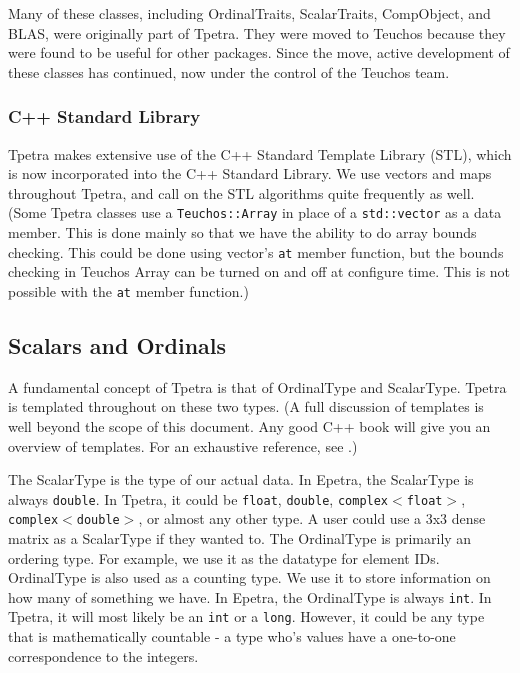 \documentclass[10pt,relax]{TpetraDesign}
\begin{document}
Many of these classes, including OrdinalTraits, ScalarTraits, CompObject, and BLAS, were originally part of Tpetra. They were moved to Teuchos because they were found to be useful for other packages. Since the move, active development of these classes has continued, now under the control of the Teuchos team.

\subsubsection*{C++ Standard Library}
Tpetra makes extensive use of the C++ Standard Template Library (STL), which is now incorporated into the C++ Standard Library. We use vectors and maps throughout Tpetra, and call on the STL algorithms quite frequently as well. (Some Tpetra classes use a \texttt{Teuchos::Array} in place of a \texttt{std::vector} as a data member. This is done mainly so that we have the ability to do array bounds checking. This could be done using vector's \texttt{at} member function, but the bounds checking in Teuchos Array can be turned on and off at configure time. This is not possible with the \texttt{at} member function.)

%
\subsection{Scalars and Ordinals}
A fundamental concept of Tpetra is that of OrdinalType and ScalarType. Tpetra is templated throughout on these two types. (A full discussion of templates is well beyond the scope of this document. Any good C++ book will give you an overview of templates. For an exhaustive reference, see \cite{Templates-Complete-Guide}.)

The ScalarType is the type of our actual data. In Epetra, the ScalarType is always \texttt{double}. In Tpetra, it could be \texttt{float}, \texttt{double}, \texttt{complex$<$float$>$}, \texttt{complex$<$double$>$}, or almost any other type. A user could use a 3x3 dense matrix as a ScalarType if they wanted to. The OrdinalType is primarily an ordering type. For example, we use it as the datatype for element IDs. OrdinalType is also used as a counting type. We use it to store information on how many of something we have. In Epetra, the OrdinalType is always \texttt{int}. In Tpetra, it will most likely be an \texttt{int} or a \texttt{long}. However, it could be any type that is mathematically countable - a type who's values have a one-to-one correspondence to the integers.
\end{document}
